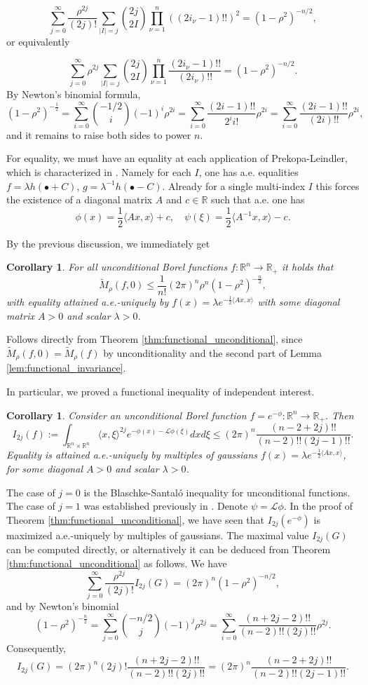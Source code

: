 \documentclass[reqno,10pt]{amsart}
\newcounter{mp}
\newtheorem{Corollary}[Proposition]{Corollary}
\newcommand{\R}{\mathbb{R}}
\begin{document}
$$ \sum_{j=0}^\infty \frac{\rho^{2j}}{(2j)!}\sum_{|I|=j}{2j\choose 2I}\prod_{\nu=1}^n ((2i_\nu-1)!!)^2 =(1-\rho^2)^{-n/2},$$
or equivalently 

$$ \sum_{j=0}^\infty \rho^{2j}\sum_{|I|=j}{2j\choose 2I}\prod_{\nu=1}^n \frac{(2i_\nu-1)!!}{(2i_\nu)!!} =(1-\rho^2)^{-n/2}.$$
By Newton's binomial formula, 
\[ (1-\rho^2)^{-\frac12}=\sum_{i=0}^\infty{-1/2 \choose i}(-1)^i\rho^{2i}=\sum_{i=0}^\infty\frac{(2i-1)!!}{2^i i!}\rho^{2i}=\sum_{i=0}^\infty\frac{(2i-1)!!}{(2i)!!}\rho^{2i}, \]
and it remains to raise both sides to power $n$.

For equality, we must have an equality at each application of Prekopa-Leindler, which is characterized in \cite{dubuc}. Namely for each $I$, one has a.e. equalities $f=\lambda h(\bullet + C)$, $g=\lambda^{-1}h(\bullet - C)$. Already for a single multi-index $I$ this forces the existence of a diagonal matrix $A$ and $c\in\R$ such that a.e. one has $$\phi(x)=\frac 12 \langle Ax, x\rangle +c,\quad \psi(\xi)=\frac 12 \langle A^{-1}x, x\rangle -c.$$
\endproof

By the previous discussion, we immediately get
\begin{Corollary}
	For all unconditional Borel functions $f:\R^n\to \R_+$ it holds that \[ \widetilde M_\rho(f,0)\leq \frac{1}{n!}(2\pi)^n\rho^n(1-\rho^2)^{-\frac n 2}, \]
	with equality attained a.e.-uniquely by $f(x)=\lambda e^{-\frac12 \langle Ax, x\rangle}$ with some diagonal matrix $A>0$ and scalar $\lambda>0$. 
\end{Corollary}
\proof
Follows directly from Theorem \ref{thm:functional_unconditional}, since $\widetilde M_\rho(f,0)=\widetilde M_\rho(f)$ by unconditionality and the second part of Lemma \ref{lem:functional_invariance}.
\endproof

In particular, we proved a functional inequality of independent interest. 
\begin{Corollary}\label{cor:even_moments}
	Consider an unconditional Borel function $f=e^{-\phi}:\R^n\to \R_+$. Then $$ I_{2j}(f):=\int_{\R^n\times\R^n}\langle x,\xi\rangle ^{2j}e^{-\phi(x)-\mathcal L\phi(\xi)}dx d\xi\leq (2\pi)^n \frac{(n-2+2j)!!}{(n-2)!!(2j-1)!!}.$$
	Equality is attained a.e.-uniquely by multiples of gaussians $f(x)=\lambda e^{-\frac 12 \langle Ax, x\rangle}$, for some diagonal $A>0$ and scalar $\lambda>0$.
\end{Corollary}
The case of $j=0$ is the Blaschke-Santal\'o inequality for unconditional functions. The case of $j=1$ was established previously in \cite{huang_li}.
\proof
Denote $\psi=\mathcal L\phi$. In the proof of Theorem \ref{thm:functional_unconditional}, we have seen that $I_{2j}(e^{-\phi})$ is maximized a.e.-uniquely by multiples of gaussians. The maximal value $I_{2j}(G)$ can be computed directly, or alternatively it can be deduced from Theorem \ref{thm:functional_unconditional} as follows. We have $$\sum_{j=0}^\infty\frac{\rho^{2j}}{(2j)!}I_{2j}(G)= (2\pi)^n(1-\rho^2)^{-n/2},$$
and by Newton's binomial 
\[ (1-\rho^2)^{-\frac n2}=\sum_{j=0}^\infty{-n/2 \choose j}(-1)^j\rho^{2j}=\sum_{i=0}^\infty\frac{(n+2j-2)!!}{(n-2)!!(2j)!! }\rho^{2j}.\]
Consequently, 
$$I_{2j}(G)=(2\pi)^n(2j)!\frac{(n+2j-2)!!}{(n-2)!!(2j)!! }=(2\pi)^n\frac{(n-2+2j)!!}{(n-2)!!(2j-1)!!}.$$
\end{document}
